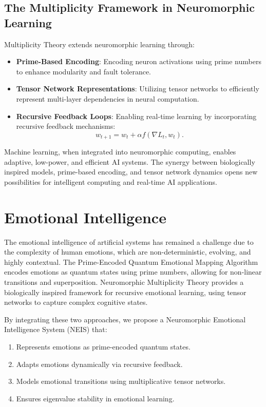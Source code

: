 \documentclass{article}
\theoremstyle{plain}
\begin{document}
\subsection{The Multiplicity Framework in Neuromorphic Learning}
Multiplicity Theory extends neuromorphic learning through:
\begin{itemize}
    \item \textbf{Prime-Based Encoding}: Encoding neuron activations using prime numbers to enhance modularity and fault tolerance.
    \item \textbf{Tensor Network Representations}: Utilizing tensor networks to efficiently represent multi-layer dependencies in neural computation.
    \item \textbf{Recursive Feedback Loops}: Enabling real-time learning by incorporating recursive feedback mechanisms:
    \begin{equation}
        w_{t+1} = w_t + \alpha f(\nabla L_t, w_t).
    \end{equation}
\end{itemize}

Machine learning, when integrated into neuromorphic computing, enables adaptive, low-power, and efficient AI systems. The synergy between biologically inspired models, prime-based encoding, and tensor network dynamics opens new possibilities for intelligent computing and real-time AI applications.

\section{Emotional Intelligence}
The emotional intelligence of artificial systems has remained a challenge due to the complexity of human emotions, which are non-deterministic, evolving, and highly contextual. The Prime-Encoded Quantum Emotional Mapping Algorithm encodes emotions as quantum states using prime numbers, allowing for non-linear transitions and superposition. Neuromorphic Multiplicity Theory provides a biologically inspired framework for recursive emotional learning, using tensor networks to capture complex cognitive states.

By integrating these two approaches, we propose a Neuromorphic Emotional Intelligence System (NEIS) that:
\begin{enumerate}
    \item Represents emotions as prime-encoded quantum states.
    \item Adapts emotions dynamically via recursive feedback.
    \item Models emotional transitions using multiplicative tensor networks.
    \item Ensures eigenvalue stability in emotional learning.
\end{enumerate}
\end{document}
